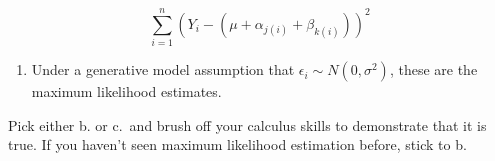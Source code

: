 \documentclass[
  letterpaper,
  DIV=11,
  numbers=noendperiod]{scrartcl}
\providecommand{\tightlist}{%
  \setlength{\itemsep}{0pt}\setlength{\parskip}{0pt}}
\begin{document}
\begin{enumerate}
  \[
  \sum_{i = 1}^n \left(Y_i - \left( \mu + \alpha_{j(i)} + \beta_{k(i)} \right) \right) ^2
  \]

  \begin{enumerate}
  \def\labelenumii{\alph{enumii}.}
  \setcounter{enumii}{2}
  \tightlist
  \item
    Under a generative model assumption that
    \(\epsilon_{i} \sim N(0, \sigma^2)\), these are the maximum
    likelihood estimates.
  \end{enumerate}

  Pick either b. or c.~and brush off your calculus skills to demonstrate
  that it is true. If you haven't seen maximum likelihood estimation
  before, stick to b.
\end{enumerate}
\end{document}
